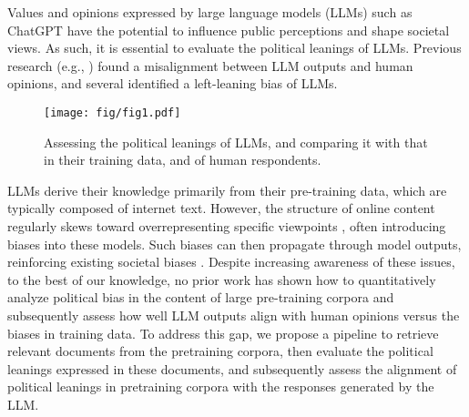 Values and opinions expressed by large language models (LLMs) such as ChatGPT \cite{openai2023gpt4} have the potential to influence public perceptions and shape societal views. As such, it is essential to evaluate the political leanings of LLMs. Previous research (e.g., \citealt{perez-etal-2023-discovering,hartmann2023political}) found a misalignment between LLM outputs and human opinions, and several identified a left-leaning bias of LLMs.
\begin{figure}[t]
\centering
\texttt{[image: fig/fig1.pdf]}
\caption{Assessing the political leanings of LLMs, and comparing it with that in their training data, and of human respondents.}
\label{fig:fig1}
\end{figure}
LLMs derive their knowledge primarily from their pre-training data, which are typically composed of internet text. However, the structure of online content regularly skews toward overrepresenting specific viewpoints \cite{10.1093/pnasnexus/pgae474}, often introducing biases into these models. Such biases can then propagate through model outputs, reinforcing existing societal biases \cite{feng-etal-2023-pretraining}. Despite increasing awareness of these issues, to the best of our knowledge, no prior work has shown how to quantitatively analyze political bias in the content of large pre-training corpora and subsequently assess how well LLM outputs align with human opinions versus the biases in training data. To address this gap, we propose a pipeline to retrieve relevant documents from the pretraining corpora, then evaluate the political leanings expressed in these documents, and subsequently assess the alignment of  political leanings in pretraining corpora with the responses generated by the LLM. 

